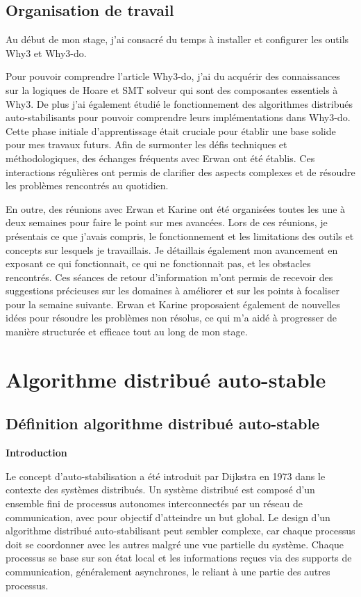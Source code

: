 \documentclass[11pt]{article}
\begin{document}
\subsection{Organisation de travail}
\label{sec:org9898cfe}

Au début de mon stage, j'ai consacré du temps à installer et configurer les outils Why3 et Why3-do.  

Pour pouvoir comprendre l'article Why3-do, j'ai du acquérir des connaissances sur la logiques de Hoare et SMT solveur qui sont des composantes essentiels à Why3.
De plus j'ai également étudié le fonctionnement des algorithmes distribués auto-stabilisants pour pouvoir comprendre leurs implémentations dans Why3-do.
Cette phase initiale d'apprentissage était cruciale pour établir une base solide pour mes travaux futurs. 
Afin de surmonter les défis techniques et méthodologiques, des échanges fréquents avec Erwan ont été établis. 
Ces interactions régulières ont permis de clarifier des aspects complexes et de résoudre les problèmes rencontrés au quotidien.

En outre, des réunions avec Erwan et Karine ont été organisées toutes les une à deux semaines pour faire le point sur mes avancées. 
Lors de ces réunions, je présentais ce que j'avais compris, le fonctionnement et les limitations des outils et concepts sur lesquels je travaillais. 
Je détaillais également mon avancement en exposant ce qui fonctionnait, ce qui ne fonctionnait pas, et les obstacles rencontrés. 
Ces séances de retour d'information m'ont permis de recevoir des suggestions précieuses sur les domaines à améliorer 
et sur les points à focaliser pour la semaine suivante. Erwan et Karine proposaient également de nouvelles idées pour résoudre les problèmes non résolus,
 ce qui m'a aidé à progresser de manière structurée et efficace tout au long de mon stage.

\section{Algorithme distribué auto-stable}
\label{sec:orgaa06fbf}


\subsection{Définition algorithme distribué auto-stable}
\label{sec:org6b2d4ea}


\textbf{\textbf{Introduction}}

Le concept d'auto-stabilisation a été introduit par Dijkstra en 1973 dans le contexte des systèmes distribués. 
Un système distribué est composé d'un ensemble fini de processus autonomes interconnectés par un réseau de communication, 
avec pour objectif d'atteindre un but global. Le design d'un algorithme distribué auto-stabilisant peut sembler complexe, 
car chaque processus doit se coordonner avec les autres malgré une vue partielle du système. 
Chaque processus se base sur son état local et les informations reçues via des supports de communication, généralement asynchrones, 
le reliant à une partie des autres processus.
\end{document}
